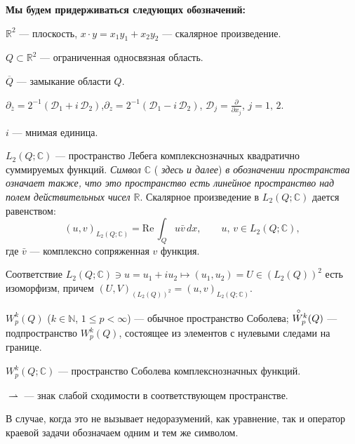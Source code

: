 \begin{list}{}{\leftmargin=10pt \itemsep=3pt}
\item\textbf{ Мы будем придерживаться следующих обозначений:}
\item $\mathbb R^2$ --- плоскость, $x\cdot y=x_1y_1+x_2y_2$ --- скалярное произведение.
\item $Q\subset \mathbb R^2$ --- ограниченная односвязная область.
\item $\overline{Q}$ --- замыкание области $Q$.
\item $\partial_{\bar z}=2^{-1}(\mathcal{D}_1+i\,\mathcal{D}_2)$,\quad $\partial_z=2^{-1}(\mathcal{D}_1-i\,\mathcal{D}_2)$,
\quad $\mathcal{D}_j=\frac{\partial}{\partial x_j}$,\quad
$j=1,\,2$.
\item $i$ --- мнимая единица.
\item $L_2(Q;\mathbb C)$ --- пространство Лебега комплекснозначных
квадратично суммируемых \linebreak
функций. \textit{ Символ $\mathbb C$ }(\textit{ здесь и далее})
\textit{ в обозначении пространства означает также, что это
пространство есть линейное пространство над полем действительных чисел $\mathbb R$}.
Скалярное произведение в $L_2(Q;\mathbb C)$ дается равенством:
$$
(u,v)_{L_2(Q;\mathbb C)}=\text
{Re}\,\int_Qu\bar v\,dx,\qquad u,\,v\in L_2(Q;\mathbb C),
$$
где $\bar v$ --- комплексно сопряженная $v$ функция.

Соответствие
$L_2(Q;\mathbb C)\ni u=u_1+iu_2\mapsto (u_1,u_2)=U\in(L_2(Q))^2$ есть
изоморфизм, причем $(U,V)_{(L_2(Q))^2}=(u,v)_{L_2(Q;\mathbb C)}$.
\item $W_p^k(Q)$ ($k\in\mathbb{N}$, $1\leqslant p<\infty$) --- обычное
пространство Соболева; $\overset{\!\!\circ}{W_p^{\smash[t]k}}(Q)$ --- подпространство
$W_p^k(Q)$, состоящее из элементов с нулевыми следами на границе.
\item $W_p^k(Q;\mathbb C)$ --- пространство Соболева комплекснозначных
функций.
\item $\rightharpoonup$ --- знак слабой сходимости в соответствующем пространстве.
\item В случае, когда это не вызывает недоразумений, как
уравнение, так и оператор краевой задачи обозначаем одним и тем же
символом.
\end{list}




